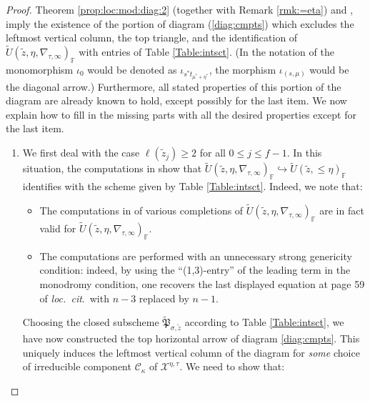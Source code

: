 \documentclass[oneside,a4paper,english, 11pt]{amsart}
\theoremstyle{plain}
\theoremstyle{plain}
\theoremstyle{plain}
\theoremstyle{plain}
\theoremstyle{plain}
\theoremstyle{plain}
\theoremstyle{definition}
\theoremstyle{definition}
\theoremstyle{definition}
\theoremstyle{remark}
\numberwithin{equation}{section}
\newcommand{\F}{\mathbb{F}}
\newcommand{\cC}{\mathcal{C}}
\newcommand{\cX}{\mathcal{X}}
\newcommand{\tld}[1]{\widetilde{#1}}
\newcommand{\into}{\hookrightarrow}
\begin{document}
\begin{proof}
%
%
 Theorem \ref{prop:loc:mod:diag:2} (together with Remark \ref{rmk:=eta}) and \cite[Proposition 5.4.7, Theorem 7.4.2]{MLM},
%
imply the existence of the portion of diagram (\ref{diag:cmpts})  which excludes the leftmost vertical column, the top triangle, and the identification of $\tld{U}(\tld{z},\eta,\nabla_{\tau,\infty})_\F$ with entries of Table \ref{Table:intsct}.
(In the notation of \cite[Proposition 5.4.7]{MLM} the monomorphism $\iota_0$ would be denoted as $\iota_{s^*t_{\mu^*+\eta^*}}$, the morphism $\iota_{(s,\mu)}$ would be the diagonal arrow.) 
%
Furthermore, all stated properties of this portion of the diagram are already known to hold, except possibly for the last item. We now explain how to fill in the missing parts with all the desired properties except for the last item.
\begin{enumerate}
\item
\label{it:pf:diag:0}
We first deal with the case $\ell(\tld{z}_j)\geq 2$ for all $0\leq j\leq f-1$.
%
%
In this situation, the computations in \cite[\S 5.3.1]{LLLM} show that $\tld{U}(\tld{z},\eta,\nabla_{\tau,\infty})_\F\into \tld{U}(\tld{z},\leq \eta)_{\F}$ identifies with the scheme given by Table \ref{Table:intsct}. Indeed, we note that:
\begin{itemize}
\item The computations in \cite[\S 5.3.1]{LLLM} of various completions of $\tld{U}(\tld{z},\eta,\nabla_{\tau,\infty})_\F$ are in fact valid for $\tld{U}(\tld{z},\eta,\nabla_{\tau,\infty})_\F$.
\item The computations are performed with an unnecessary strong genericity condition: indeed, by using the ``(1,3)-entry'' of the leading term in the monodromy condition, one recovers the last displayed equation at page 59 of \emph{loc.~cit}.~with $n-3$ replaced by $n-1$.
%
%
%
%
%
%
%
%
%
%
\end{itemize}
Choosing the closed subscheme $\tld{\mathfrak{P}}_{\sigma,\tld{z}}$ according to Table \ref{Table:intsct}, we have now constructed the top horizontal arrow of diagram \ref{diag:cmpts}. This uniquely induces the leftmost vertical column of the diagram for \emph{some} choice of irreducible component $\cC_{\kappa}$ of $\cX^{\eta,\tau}$. We need to show that:


%


\end{enumerate}
\end{proof}
\end{document}
